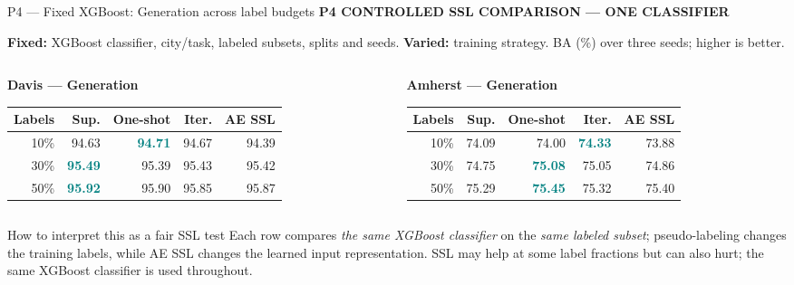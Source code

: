 \documentclass[aspectratio=169,11pt]{beamer}
\newcommand{\sectiontag}[1]{{\footnotesize\usebeamercolor[fg]{structure}\textbf{#1}}\par\vspace{0.10cm}}
\newcommand{\smallmuted}[1]{{\footnotesize\color{slate}#1\par}}
\begin{document}
\begin{frame}{P4 — Fixed XGBoost: Generation across label budgets}
\sectiontag{P4 \quad CONTROLLED SSL COMPARISON — ONE CLASSIFIER}
\smallmuted{\textbf{Fixed:} XGBoost classifier, city/task, labeled subsets, splits and seeds. \textbf{Varied:} training strategy. BA (\%) over three seeds; higher is better.}
\vspace{0.20cm}
\begin{columns}[T,totalwidth=\textwidth]
\begin{column}{0.49\textwidth}
\textbf{Davis — Generation}\par\vspace{0.10cm}
{\fontsize{8.2}{9.6}\selectfont\setlength{\tabcolsep}{2.9pt}\renewcommand{\arraystretch}{1.40}
\begin{tabular}{@{}rrrrr@{}}\toprule
\textbf{Labels} & \textbf{Sup.} & \textbf{One-shot} & \textbf{Iter.} & \textbf{AE SSL}\\\midrule
10\% & 94.63 & \textcolor{teal}{\textbf{94.71}} & 94.67 & 94.39\\
30\% & \textcolor{teal}{\textbf{95.49}} & 95.39 & 95.43 & 95.42\\
50\% & \textcolor{teal}{\textbf{95.92}} & 95.90 & 95.85 & 95.87\\
\bottomrule\end{tabular}}
\end{column}
\begin{column}{0.49\textwidth}
\textbf{Amherst — Generation}\par\vspace{0.10cm}
{\fontsize{8.2}{9.6}\selectfont\setlength{\tabcolsep}{2.9pt}\renewcommand{\arraystretch}{1.40}
\begin{tabular}{@{}rrrrr@{}}\toprule
\textbf{Labels} & \textbf{Sup.} & \textbf{One-shot} & \textbf{Iter.} & \textbf{AE SSL}\\\midrule
10\% & 74.09 & 74.00 & \textcolor{teal}{\textbf{74.33}} & 73.88\\
30\% & 74.75 & \textcolor{teal}{\textbf{75.08}} & 75.05 & 74.86\\
50\% & 75.29 & \textcolor{teal}{\textbf{75.45}} & 75.32 & 75.40\\
\bottomrule\end{tabular}}
\end{column}
\end{columns}
\vspace{0.25cm}
\begin{block}{How to interpret this as a fair SSL test}
\footnotesize Each row compares \emph{the same XGBoost classifier} on the \emph{same labeled subset}; pseudo-labeling changes the training labels, while AE SSL changes the learned input representation. SSL may help at some label fractions but can also hurt; the same XGBoost classifier is used throughout.
\end{block}
\end{frame}
\end{document}
